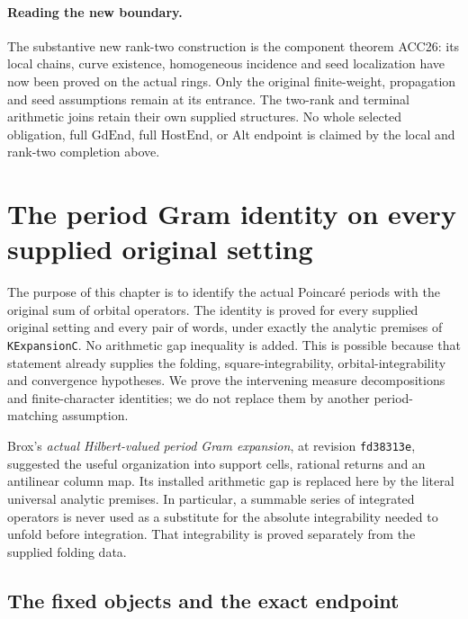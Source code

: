 \documentclass[11pt,a4paper]{article}
\numberwithin{equation}{section}
\theoremstyle{remark}\newtheorem{remark}[theorem]{Remark}
\begin{document}
\paragraph{Reading the new boundary.}
The substantive new rank-two construction is the component theorem
ACC26: its local chains, curve existence, homogeneous incidence and
seed localization have now been proved on the actual rings.  Only
the original finite-weight, propagation and seed assumptions remain
at its entrance.  The two-rank and terminal arithmetic joins retain
their own supplied structures.  No whole selected obligation, full
\(\mathrm{GdEnd}\), full \(\mathrm{HostEnd}\), or Alt endpoint
is claimed by the local and rank-two completion above.


\section{The period Gram identity on every supplied original setting}
\label{sec:period-gram-v57}

The purpose of this chapter is to identify the actual Poincar\'e periods
with the original sum of orbital operators.  The identity is proved for
every supplied original setting and every pair of words, under exactly
the analytic premises of \texttt{KExpansion\allowbreak C}.  No arithmetic gap
inequality is added.  This is possible because that statement already
supplies the folding, square-integrability, orbital-integrability and
convergence hypotheses.  We prove the intervening measure decompositions
and finite-character identities; we do not replace them by another
period-matching assumption.

Brox's \emph{actual Hilbert-valued period Gram expansion}, at revision
\texttt{fd38313e}, suggested the useful
organization into support cells, rational returns and an antilinear
column map.  Its installed arithmetic gap is replaced here by the
literal universal analytic premises.  In particular, a summable series
of integrated operators is never used as a substitute for the absolute
integrability needed to unfold before integration.  That integrability
is proved separately from the supplied folding data.

\subsection{The fixed objects and the exact endpoint}
\end{document}
